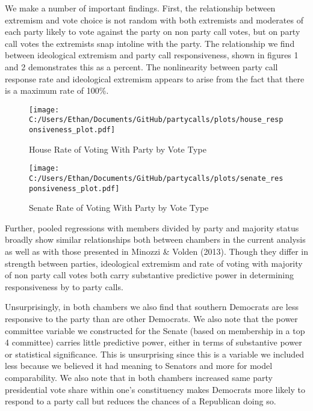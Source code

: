 \documentclass[12pt]{article}
\begin{document}
We make a number of important findings. First, the relationship between extremism and vote choice is not random with both extremists and moderates of each party likely to vote against the party on non party call votes, but on party call votes the extremists snap intoline with the party. The relationship we find between ideological extremism and party call responsiveness, shown in figures 1 and 2 demonstrates this as a percent. The nonlinearity between party call response rate and ideological extremism appears to arise from the fact that there is a maximum rate of 100\%.

\begin{figure}[H]
	\centering
	\caption{House Rate of Voting With Party by Vote Type}
	\texttt{[image: C:/Users/Ethan/Documents/GitHub/partycalls/plots/house\_responsiveness\_plot.pdf]}
\end{figure}

\begin{figure}[H]
	\centering
	\caption{Senate Rate of Voting With Party by Vote Type}
	\texttt{[image: C:/Users/Ethan/Documents/GitHub/partycalls/plots/senate\_responsiveness\_plot.pdf]}
\end{figure}

Further, pooled regressions with members divided by party and majority status broadly show similar relationships both between chambers in the current analysis as well as with those presented in Minozzi \& Volden (2013). Though they differ in strength between parties, ideological extremism and rate of voting with majority of non party call votes both carry substantive predictive power in determining responsiveness by to party calls. 

Unsurprisingly, in both chambers we also find that southern Democrats are less responsive to the party than are other Democrats. We also note that the power committee variable we constructed for the Senate (based on membership in a top 4 committee) carries little predictive power, either in terms of substantive power or statistical significance. This is unsurprising since this is a variable we included less because we believed it had meaning to Senators and more for model comparability. We also note that in both chambers increased same party presidential vote share within one's constituency makes Democrats more likely to respond to a party call but reduces the chances of a Republican doing so.
\end{document}
